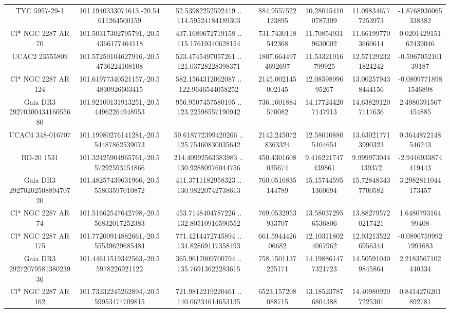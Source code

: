 \begin{table}
\begin{tabular}{ccccccc}
TYC 5957-29-1 & 101.1940333071613,-20.54611264500159 & 52.53982252592419 .. 114.59524184189303 & 884.9557522123895 & 10.280154100787309 & 11.098346777253973 & -1.8768936065338382 \\
Cl* NGC 2287     AR      70 & 101.50317302795791,-20.54366177464118 & 437.1689672719158 .. 115.17619340628154 & 731.7430118542368 & 11.708549319630002 & 11.661997703660614 & 0.020142915162439046 \\
UCAC2  23555809 & 101.57259104627916,-20.54736224108108 & 523.4745497057261 .. 121.03728228398371 & 1807.6644974692697 & 11.53321916799925 & 12.571292321824242 & -0.596705210139187 \\
Cl* NGC 2287     AR     124 & 101.61977340521157,-20.54830926603415 & 582.1564312062087 .. 122.9646544058252 & 2145.002145002145 & 12.0859899695267 & 13.002579438444156 & -0.08097718981546898 \\
Gaia DR3 2927030043416055680 & 101.92100131913251,-20.544962264948953 & 956.9507457580195 .. 123.22598557190942 & 736.1601884570082 & 14.177244207147913 & 14.638291207117636 & 2.4980391567454885 \\
UCAC4 348-016707 & 101.19980276141281,-20.554487862539073 & 59.618772399420266 .. 125.75460830035642 & 2142.2450728363324 & 12.580108805404654 & 13.630217713990323 & 0.3644872148546243 \\
BD-20  1531 & 101.32425904965761,-20.557292593154866 & 214.40992563383983 .. 130.92880976044756 & 450.4301608035674 & 9.416221747439861 & 9.999973044139372 & -2.9446933874419443 \\
Gaia DR3 2927020250889470720 & 101.48257439631966,-20.555803597010872 & 411.3711182958323 .. 130.98220742738613 & 760.0516835144789 & 15.157445951360694 & 15.728483437700582 & 3.2982811044173457 \\
Cl* NGC 2287     AR      74 & 101.51662547642798,-20.556832017252383 & 453.7148404787226 .. 132.80510916590552 & 769.0532953933707 & 13.580372956536806 & 13.882795720217421 & 1.648079316499408 \\
Cl* NGC 2287     AR     175 & 101.77200914882661,-20.555539629685484 & 771.4214472745894 .. 134.82869117358493 & 661.594442606682 & 12.103118024067962 & 12.932135226956344 & -0.08907599927991683 \\
Gaia DR3 2927207958138023936 & 101.44611519342563,-20.55978226921122 & 365.9617009700794 .. 135.76913622283615 & 758.1501137225171 & 14.198861477321723 & 14.505910409845864 & 2.2183567102440334 \\
Cl* NGC 2287     AR     162 & 101.73232245262894,-20.559953474709815 & 721.9812219220461 .. 140.06234614653135 & 6523.157208088715 & 13.185237876804388 & 14.409809207225301 & 0.8414276201892781 \\

\end{tabular}
\end{table}
